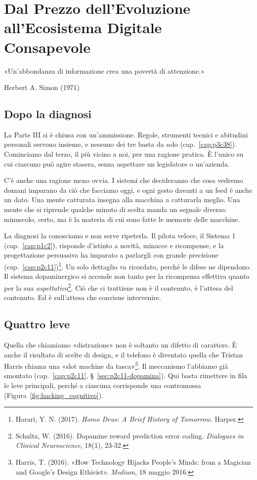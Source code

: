 \chapter{Dal Prezzo dell'Evoluzione all'Ecosistema Digitale Consapevole}
\label{cap:p4c10}

\epigraph{«Un'abbondanza di informazione crea una povertà di attenzione.»}{Herbert A. Simon (1971)}

\section{Dopo la diagnosi}

La Parte III si è chiusa con un'ammissione. Regole, strumenti tecnici e abitudini personali servono insieme, e nessuno dei tre basta da solo (cap.~\ref{cap:p3c38}). Cominciamo dal terzo, il più vicino a noi, per una ragione pratica. È l'unico su cui ciascuno può agire stasera, senza aspettare un legislatore o un'azienda.

C'è anche una ragione meno ovvia. I sistemi che decideranno che cosa vedremo domani imparano da ciò che facciamo oggi, e ogni gesto davanti a un feed è anche un dato. Una mente catturata insegna alla macchina a catturarla meglio. Una mente che si riprende qualche minuto di scelta manda un segnale diverso: minuscolo, certo, ma è la materia di cui sono fatte le memorie delle macchine.

La diagnosi la conosciamo e non serve ripeterla. Il pilota veloce, il Sistema 1 (cap.~\ref{cap:p1c2}), risponde d'istinto a novità, minacce e ricompense, e la progettazione persuasiva ha imparato a parlargli con grande precisione (cap.~\ref{cap:p2c11})\footnote{Harari, Y. N. (2017). \textit{Homo Deus: A Brief History of Tomorrow}. Harper.}. Un solo dettaglio va ricordato, perché le difese ne dipendono. Il sistema dopaminergico si accende non tanto per la ricompensa effettiva quanto per la sua \textit{aspettativa}\footnote{Schultz, W. (2016). Dopamine reward prediction error coding. \textit{Dialogues in Clinical Neuroscience}, 18(1), 23-32.}. Ciò che ci trattiene non è il contenuto, è l'attesa del contenuto. Ed è sull'attesa che conviene intervenire.

\section{Quattro leve}
\label{sec:p4c10-anatomia}

Quella che chiamiamo «distrazione» non è soltanto un difetto di carattere. È anche il risultato di scelte di design, e il telefono è diventato quella che Tristan Harris chiama una «slot machine da tasca»\footnote{Harris, T. (2016). «How Technology Hijacks People's Minds: from a Magician and Google's Design Ethicist». \textit{Medium}, 18 maggio 2016.}. Il meccanismo l'abbiamo già smontato (cap.~\ref{cap:p2c11}, \S~\ref{sec:p2c11-dopamina}). Qui basta rimettere in fila le leve principali, perché a ciascuna corrisponde una contromossa (Figura~\ref{fig:hacking_cognitivo}).

